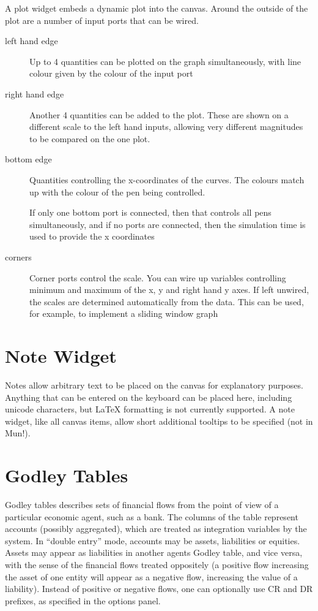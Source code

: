 A plot widget embeds a dynamic plot into the canvas. Around the
outside of the plot are a number of input ports that can be wired.


\begin{description}
\item[left hand edge] Up to 4 quantities can be plotted on the graph
  simultaneously, with line colour given by the colour of the input
  port
\item[right hand edge] Another 4 quantities can be added to the
  plot. These are shown on a different scale to the left hand inputs,
  allowing very different magnitudes to be compared on the one plot.
\item[bottom edge] Quantities controlling the x-coordinates of the
  curves. The colours match up with the colour of the pen being
  controlled.

  If only one bottom port is connected, then that controls all pens
  simultaneously, and if no ports are connected, then the simulation
  time is used to provide the x coordinates
\item[corners] Corner ports control the scale. You can wire up
  variables controlling minimum and maximum of the x, y and right hand
  y axes. If left unwired, the scales are determined automatically
  from the data. This can be used, for example, to implement a sliding
  window graph
\end{description}

\section{Note Widget}
 \label{Notes} Notes allow arbitrary text to be
placed on the canvas for explanatory purposes. Anything that can be
entered on the keyboard can be placed here, including unicode
characters, but LaTeX formatting is not currently supported. A note
widget, like all canvas items, allow short additional tooltips to be
specified (not in Mun!). 

\section{Godley Tables}\label{godley}

Godley tables describes sets of financial flows from the point of view
of a particular economic agent, such as a bank. The columns of the
table represent accounts (possibly aggregated), which are treated as
integration variables by the system. In ``double entry'' mode,
accounts may be assets, liabilities or equities. Assets may appear as
liabilities in another agents Godley table, and vice versa, with the
sense of the financial flows treated oppositely (a positive flow increasing the
asset of one entity will appear as a negative flow, increasing the
value of a liability). Instead of positive or negative flows, one can
optionally use CR and DR prefixes, as specified in the options panel.

